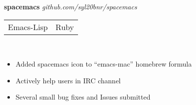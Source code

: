 \documentclass[margin,line,12pt]{res}
\begin{document}
{\begin{resume}
{\bf spacemacs} {\em github.com/syl20bnr/spacemacs}  \
\\
\begin{tabular}{l l}
  Emacs-Lisp & Ruby
\end{tabular}
\\
\vspace{-.10in}
\begin{itemize}
  \item Added spacemacs icon to ``emacs-mac'' homebrew formula
  \item Actively help users in IRC channel
  \item Several small bug fixes and Issues submitted
\end{itemize}




\end{resume}}
\end{document}
